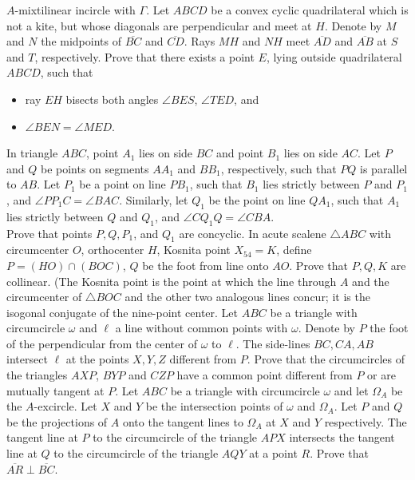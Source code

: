 \documentclass{seto}
\begin{document}
$A$-mixtilinear incircle with $\Gamma$.
 Let $ABCD$ be a convex cyclic quadrilateral which is not a kite, but whose diagonals are perpendicular and meet at $H$. Denote by $M$ and $N$ the midpoints of $\overline{BC}$ and $\overline{CD}$. Rays $MH$ and $NH$ meet $\overline{AD}$ and $\overline{AB}$ at $S$ and $T$, respectively. Prove that there exists a point $E$, lying outside quadrilateral $ABCD$, such that
\begin{itemize}
  \item ray $EH$ bisects both angles $\angle BES$, $\angle TED$, and
  \item $\angle BEN = \angle MED$.
\end{itemize}
\exercise[IMO 2019/2] In triangle $ABC$, point $A_1$ lies on side $BC$ and point $B_1$ lies on side $AC$. Let $P$ and $Q$ be points on segments $AA_1$ and $BB_1$, respectively, such that $PQ$ is parallel to $AB$. Let $P_1$ be a point on line $PB_1$, such that $B_1$ lies strictly between $P$ and $P_1$, and $\angle PP_1C=\angle BAC$. Similarly, let $Q_1$ be the point on line $QA_1$, such that $A_1$ lies strictly between $Q$ and $Q_1$, and $\angle CQ_1Q=\angle CBA$. \\[4pt]
Prove that points $P,Q,P_1$, and $Q_1$ are concyclic. 
\exercise[MOP HW \#21] In acute scalene $\triangle ABC$ with circumcenter $O$, orthocenter $H$, Kosnita point $X_{54}=K$, define $P=(HO)\cap(BOC)$, $Q$ be the foot from line onto $AO$. Prove that $P,Q,K$ are collinear. (The Kosnita point is the point at which the line through $A$ and the circumcenter of $\triangle BOC$ and the other two analogous lines concur; it is the isogonal conjugate of the nine-point center. 
\exercise[Shortlist 2012/G8]Let $ABC$ be a triangle with circumcircle $\omega$ and $\ell$ a line without common points with $\omega$. Denote by $P$ the foot of the perpendicular from the center of $\omega$ to $\ell$. The side-lines $BC,CA,AB$ intersect $\ell$ at the points $X,Y,Z$ different from $P$. Prove that the circumcircles of the triangles $AXP$, $BYP$ and $CZP$ have a common point different from $P$ or are mutually tangent at $P$.
\exercise[Shortlist 2021/G8]Let $ABC$ be a triangle with circumcircle $\omega$ and let $\Omega_A$ be the $A$-excircle. Let $X$ and $Y$ be the intersection points of $\omega$ and $\Omega_A$. Let $P$ and $Q$ be the projections of $A$ onto the tangent lines to $\Omega_A$ at $X$ and $Y$ respectively. The tangent line at $P$ to the circumcircle of the triangle $APX$ intersects the tangent line at $Q$ to the circumcircle of the triangle $AQY$ at a point $R$. Prove that $\overline{AR} \perp \overline{BC}$.
\end{document}
